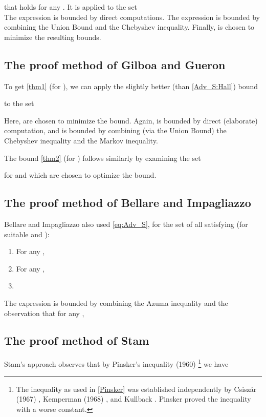 \documentclass{llncs}
\numberwithin{equation}{section}
\numberwithin{lemma}{section}
\numberwithin{proposition}{section}
\begin{document}
that holds for any .
It is applied to the set
 \\

The expression 
  is bounded by direct computations. The expression  is bounded by combining the Union Bound and the Chebyshev inequality. Finally,  is chosen to minimize the resulting bounds.


\subsection{The proof method of Gilboa and Gueron}

To get \eqref{thm1} (for ), we can apply the slightly better (than \eqref{Adv_S:Hall}) bound

to the set

Here,  are chosen to minimize the bound.
Again,  is bounded by direct (elaborate) computation, and  is bounded by combining (via the Union Bound) the Chebyshev inequality and the Markov inequality.

The bound \eqref{thm2} (for ) follows similarly by examining the set

for  and  which are chosen to optimize the bound. 

\subsection{The proof method of Bellare and Impagliazzo}

Bellare and Impagliazzo also used \eqref{eq:Adv_S}, for the set  of all  satisfying (for suitable  and ):


\begin{enumerate}
\item For any ,
 
\item  For any ,
 
\item 
 
\end{enumerate}

The expression  is bounded by combining the Azuma inequality and the observation that for any ,


\subsection{The proof method of Stam}

Stam's approach observes that by Pinsker's inequality (1960) \cite{Pinsker} 
\footnote{
The inequality as used in \eqref{Pinsker} was established independently by Csisz\'ar (1967) \cite{Csiszar}, Kemperman (1968) \cite{Kemperman}, and Kullback \cite{Kullback}. Pinsker proved the inequality with a worse constant.} we have
\end{document}
